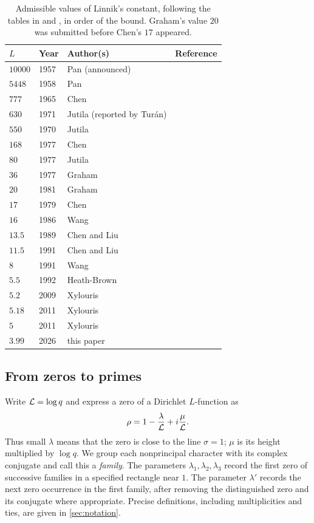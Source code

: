 \begin{table}[ht]
\centering
\begin{tabular}{llll}
\toprule
$L$ & Year & Author(s) & Reference \\
\midrule
$10000$ & 1957 & Pan (announced) & \cite{Pan1957least} \\
$5448$ & 1958 & Pan & \cite{Pan1958least} \\
$777$ & 1965 & Chen & \cite{Chen1965least} \\
$630$ & 1971 & Jutila (reported by Tur\'an) & \cite{Turan1971recent} \\
$550$ & 1970 & Jutila & \cite{Jutila1970new} \\
$168$ & 1977 & Chen & \cite{Chen1977least} \\
$80$ & 1977 & Jutila & \cite{Jutila1977linnik} \\
$36$ & 1977 & Graham & \cite{Graham1977thesis} \\
$20$ & 1981 & Graham & \cite{Graham1981linnik} \\
$17$ & 1979 & Chen & \cite{Chen1979least} \\
$16$ & 1986 & Wang & \cite{Wang1986least} \\
$13.5$ & 1989 & Chen and Liu & \cite{ChenLiu1989III,ChenLiu1989IV} \\
$11.5$ & 1991 & Chen and Liu & \cite{ChenLiu1991V} \\
$8$ & 1991 & Wang & \cite{Wang1991least} \\
$5.5$ & 1992 & Heath-Brown & \cite{HeathBrown1992zero} \\
$5.2$ & 2009 & Xylouris & \cite{Xylouris2009linnik} \\
$5.18$ & 2011 & Xylouris & \cite{Xylouris2011least} \\
$5$ & 2011 & Xylouris & \cite{Xylouris2011nullstellen,Xylouris2018linnik} \\
\midrule
$3.99$ & 2026 & this paper & \\
\bottomrule
\end{tabular}
\caption{Admissible values of Linnik's constant, following the tables in
\cite{HeathBrown1992zero} and \cite{Xylouris2011least}, in order of the bound. Graham's value $20$
was submitted before Chen's $17$ appeared.}
\label{tab:history}
\end{table}

\subsection{From zeros to primes}\label{subsec:outline}
Write $\mathcal{L}=\log q$ and express a zero of a Dirichlet $L$-function as
\[
  \rho=1-\frac{\lambda}{\mathcal{L}}+i\frac{\mu}{\mathcal{L}}.
\]
Thus small $\lambda$ means that the zero is close to the line $\sigma=1$; $\mu$ is its
height multiplied by $\log q$. We group each nonprincipal character with its complex
conjugate and call this a \emph{family}. The parameters $\lambda_1,\lambda_2,\lambda_3$
record the first zero of successive families in a specified rectangle near $1$.
The parameter $\lambda'$ records the next zero occurrence in the first family, after
removing the distinguished zero and its conjugate where appropriate. Precise definitions,
including multiplicities and ties, are given in \cref{sec:notation}.

